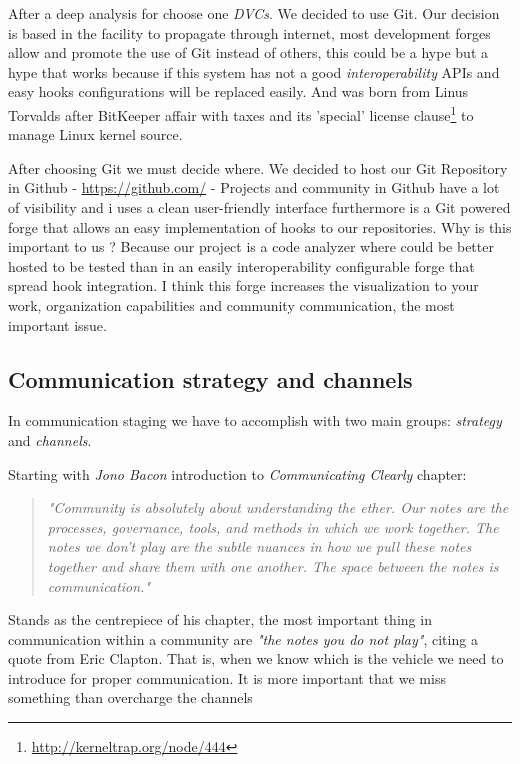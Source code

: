 \documentclass[11pt]{scrartcl}
\begin{document}
\par After a deep analysis for choose one \emph{DVCs}. We decided to use Git. Our decision is based in the facility to propagate through internet, most development forges allow and promote the use of Git instead of others, this could be a hype but a hype that works because if this system has not a good \emph{interoperability} APIs and easy hooks configurations will be replaced easily. And was born from Linus Torvalds after BitKeeper affair with taxes and its 'special' license clause\footnote{\url{http://kerneltrap.org/node/444}} to manage Linux kernel source.

\par After choosing Git we must decide where. We decided to host our Git Repository in Github - \url{https://github.com/} - Projects and community in Github have a lot of visibility and i uses a clean user-friendly interface furthermore is a Git powered forge that allows an easy implementation of hooks to our repositories. Why is this important to us ? Because our project is a code analyzer where could be better hosted to be tested than in an easily interoperability configurable forge that spread hook integration. I think this forge increases the visualization to your work, organization capabilities and community communication, the most important issue.


\subsection{Communication strategy and channels}
\label{sub:communication-strategy}

\par In communication staging we have to accomplish with two main groups: \emph{strategy} and \emph{channels}.

\par Starting with \emph{Jono Bacon}\cite{art-of-community} introduction to \emph{Communicating Clearly} chapter:
\begin{quotation}
    \emph{"Community is absolutely about understanding the ether. Our notes are the processes, governance, tools, and methods in which we work together. The notes we don’t play are the subtle nuances in how we pull these notes together and share them with one another. The space between the notes is communication."}
\end{quotation}

\par Stands as the centrepiece of his chapter, the most important thing in communication within a community are \emph{"the notes you do not play"}, citing a quote from Eric Clapton. That is, when we know which is the vehicle we need to introduce for proper communication. It is more important that we miss something than overcharge the channels
\end{document}
